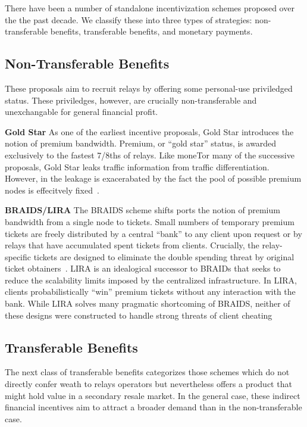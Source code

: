 There have been a number of standalone incentivization schemes proposed over the
the past decade. We classify these into three types of strategies:
non-transferable benefits, transferable benefits, and monetary
payments.
\subsection{Non-Transferable Benefits}

These proposals aim to recruit relays by offering some personal-use priviledged
status. These priviledges, however, are crucially non-transferable and
unexchangable for general financial profit.

\textbf{Gold Star} As one of the earliest incentive proposals, Gold Star introduces the notion of
premium bandwidth. Premium, or ``gold star'' status, is awarded exclusively to
the fastest 7/8ths of relays. Like moneTor many of the successive proposals,
Gold Star leaks traffic information from traffic differentiation. However, in
the leakage is exacerabated by the fact the pool of possible premium nodes is
effecitvely fixed~\cite{dingledine2010building}.

\textbf{BRAIDS/LIRA} The BRAIDS scheme shifts ports the notion of premium
bandwidth from a single node to tickets. Small numbers of temporary premium
tickets are freely distributed by a central ``bank'' to any client upon request
or by relays that have accumulated spent tickets from clients. Crucially, the
relay-specific tickets are designed to eliminate the double spending threat by
original ticket obtainers~\cite{jansen2010recruiting}. LIRA is an idealogical
successor to BRAIDs that seeks to reduce the scalability limits imposed by the
centralized infrastructure. In LIRA, clients probabilistically ``win'' premium
tickets without any interaction with the bank. While LIRA solves many pragmatic
shortcoming of BRAIDS, neither of these designs were constructed to handle
strong threats of client cheating~\cite{jansen2013lira}

\subsection{Transferable Benefits}

The next class of transferable benefits categorizes those schemes which do not
directly confer weath to relays operators but nevertheless offers a product that
might hold value in a secondary resale market. In the general case, these
indirect financial incentives aim to attract a broader demand than in the
non-transferable case.

